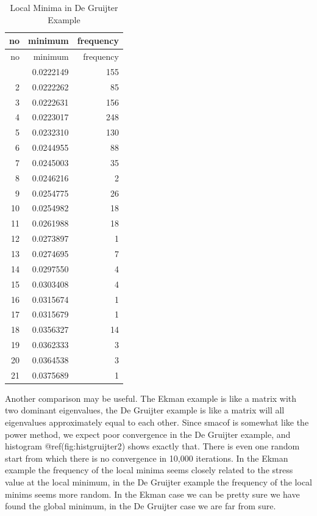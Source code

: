 \documentclass[
  12pt,
  letterpaper,
  DIV=11,
  numbers=noendperiod]{scrreprt}
\theoremstyle{remark}
\begin{document}
\begin{longtable}[]{@{}rrr@{}}
\caption{Local Minima in De Gruijter Example}\tabularnewline
\toprule\noalign{}
no & minimum & frequency \\
\midrule\noalign{}
\endfirsthead
\toprule\noalign{}
no & minimum & frequency \\
\midrule\noalign{}
\endhead
\bottomrule\noalign{}
\endlastfoot
1 & 0.0222149 & 155 \\
2 & 0.0222262 & 85 \\
3 & 0.0222631 & 156 \\
4 & 0.0223017 & 248 \\
5 & 0.0232310 & 130 \\
6 & 0.0244955 & 88 \\
7 & 0.0245003 & 35 \\
8 & 0.0246216 & 2 \\
9 & 0.0254775 & 26 \\
10 & 0.0254982 & 18 \\
11 & 0.0261988 & 18 \\
12 & 0.0273897 & 1 \\
13 & 0.0274695 & 7 \\
14 & 0.0297550 & 4 \\
15 & 0.0303408 & 4 \\
16 & 0.0315674 & 1 \\
17 & 0.0315679 & 1 \\
18 & 0.0356327 & 14 \\
19 & 0.0362333 & 3 \\
20 & 0.0364538 & 3 \\
21 & 0.0375689 & 1 \\
\end{longtable}

Another comparison may be useful. The Ekman example is like a matrix
with two dominant eigenvalues, the De Gruijter example is like a matrix
will all eigenvalues approximately equal to each other. Since smacof is
somewhat like the power method, we expect poor convergence in the De
Gruijter example, and histogram @ref(fig:histgruijter2) shows exactly
that. There is even one random start from which there is no convergence
in 10,000 iterations. In the Ekman example the frequency of the local
minima seems closely related to the stress value at the local minimum,
in the De Gruijter example the frequency of the local minims seems more
random. In the Ekman case we can be pretty sure we have found the global
minimum, in the De Gruijter case we are far from sure.
\end{document}
